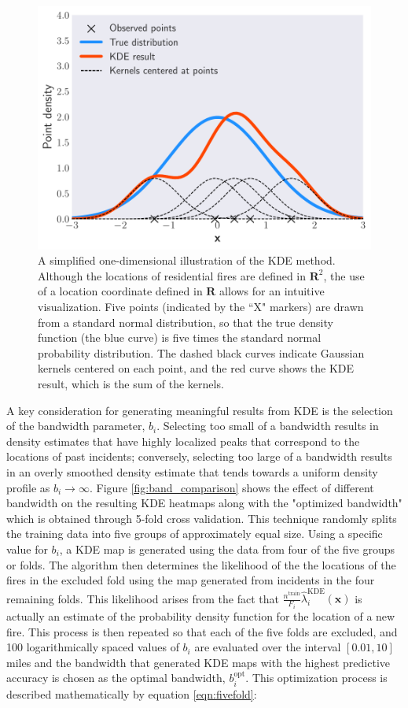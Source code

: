 \documentclass{svjour3}
\begin{document}
\begin{figure}[htb] \centering
\includegraphics[width=.75\textwidth]{./figures/1dkde.pdf}
\caption{A simplified one-dimensional illustration of the KDE method. Although the locations of residential fires are defined in $\textbf{R}^2$, the use of a location coordinate defined in $\textbf{R}$ allows for an intuitive visualization. Five points (indicated by the ``X" markers) are drawn from a standard normal distribution, so that the true density function (the blue curve) is five times the standard normal probability distribution. The dashed black curves indicate Gaussian kernels centered on each point, and the red curve shows the KDE result, which is the sum of the kernels.}
\label{fig:1dkde}
\end{figure}

A key consideration for generating meaningful results from KDE is the selection of the bandwidth parameter, $b_i$. Selecting too small of a bandwidth results in density estimates that have highly localized peaks that correspond to the locations of past incidents; conversely, selecting too large of a bandwidth results in an overly smoothed density estimate that tends towards a uniform density profile as $b_i \rightarrow  \infty$. Figure \ref{fig:band_comparison} shows the effect of different bandwidth on the resulting KDE heatmaps along with the "optimized bandwidth" which is obtained through 5-fold cross validation. This technique randomly splits the training data into five groups of approximately equal size. Using a specific value for $b_i$, a KDE map is generated using the data from four of the five groups or folds. The algorithm then determines the likelihood of the the locations of the fires in the excluded fold using the map generated from incidents in the four remaining folds. This likelihood arises from the fact that $\frac{n^{\text{train}}}{F_i}\hat\lambda_{i}^\text{KDE}(\textbf{x})$ is actually an estimate of the probability density function for the location of a new fire. This process is then repeated so that each of the five folds are excluded, and 100 logarithmically spaced values of $b_i$ are evaluated over the interval $[0.01,10]$ miles and the bandwidth that generated KDE maps with the highest predictive accuracy is chosen as the optimal bandwidth, $b_{i}^{\text{opt}}$. This optimization process is described mathematically by equation \ref{eqn:fivefold}:
\end{document}
